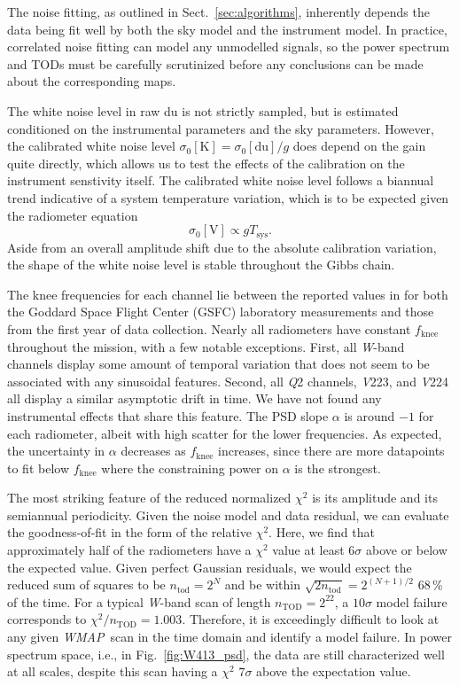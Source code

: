 \documentclass[twocolumn]{../../common/aa}
\def\WMAP{\emph{WMAP}}
\newcommand{\Q}[0]{\textit Q}
\newcommand{\V}[0]{\textit V}
\newcommand{\W}[0]{\textit W}
\begin{document}
The noise fitting, as outlined in Sect.~\ref{sec:algorithms}, inherently depends the data being fit well by both the sky model and the instrument model. In practice, correlated noise fitting can model any unmodelled signals, so the power spectrum and TODs must be carefully scrutinized before any conclusions can be made about the corresponding maps.

The white noise level in raw du is not strictly sampled, but is estimated conditioned on the instrumental parameters and the sky parameters. However, the calibrated white noise level $\sigma_0[\mathrm K]=\sigma_0[\mathrm{du}]/g$ does depend on the gain quite directly, which allows us to test the effects of the calibration on the instrument senstivity itself. The calibrated white noise level follows a biannual trend indicative of a system temperature variation, which is to be expected given the radiometer equation
\begin{equation}
	\sigma_0[\mathrm V]\propto gT_\mathrm{sys}.
\end{equation}
Aside from an overall amplitude shift due to the absolute calibration variation, the shape of the white noise level is stable throughout the Gibbs chain.

The knee frequencies for each channel lie between the reported values in \citet{jarosik2003a} for both the Goddard Space Flight Center (GSFC) laboratory measurements and those from the first year of data collection. Nearly all radiometers have constant $f_\mathrm{knee}$ throughout the mission, with a few notable exceptions. First, all \W-band channels display some amount of temporal variation that does not seem to be associated with any sinusoidal features. Second, all \Q2 channels, \V223, and \V224 all display a similar asymptotic drift in time. We have not found any instrumental effects that share this feature.
The PSD slope $\alpha$ is around $-1$ for each radiometer, albeit with high scatter for the lower frequencies. As expected, the uncertainty in $\alpha$ decreases as $f_\mathrm{knee}$ increases, since there are more datapoints to fit below $f_\mathrm{knee}$ where the constraining power on $\alpha$ is the strongest.


The most striking feature of the reduced normalized $\chi^2$ is its amplitude
and its semiannual periodicity.  Given the noise model and data residual, we
can evaluate the goodness-of-fit in the form of the relative $\chi^2$. Here, we
find that approximately half of the radiometers have a $\chi^2$ value at least
$6\sigma$ above or below the expected value.  Given perfect Gaussian residuals,
we would expect the reduced sum of squares to be $n_\mathrm{tod}=2^N$ and be
within $\sqrt{2n_\mathrm{tod}}=2^{(N+1)/2}$ 68\,\% of the time. For a typical
\W-band scan of length $n_\mathrm{TOD}=2^{22}$, a $10\sigma$ model failure
corresponds to $\chi^2/n_\mathrm{TOD}=1.003$. Therefore, it is exceedingly
difficult to look at any given \WMAP\ scan in the time domain and identify a
model failure. In power spectrum space, i.e., in Fig.~\ref{fig:W413_psd}, the
data are still characterized well at all scales, despite this scan having a
$\chi^2$ $7\sigma$ above the expectation value. 
\end{document}
